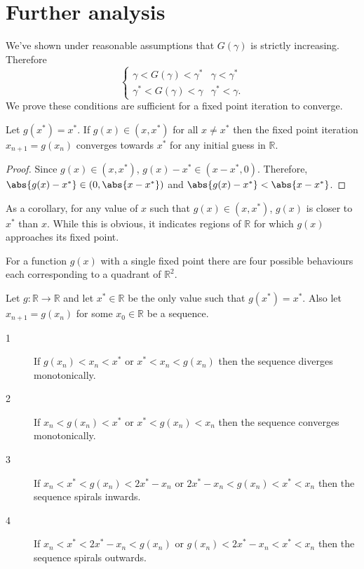 \documentclass{book}
\begin{document}
\section{Further analysis}

We've shown under reasonable assumptions that $G(\gamma)$ is strictly increasing.
Therefore
\begin{equation*}
\begin{cases} \gamma < G(\gamma) < \gamma^* & \gamma < \gamma^* \\
\gamma^* < G(\gamma) < \gamma & \gamma^* < \gamma . \end{cases}
\end{equation*}
We prove these conditions are sufficient for a fixed point iteration to converge.

\begin{lemma}
Let $g(x^*) = x^*$.
If $g(x) \in (x, x^*)$ for all $x \neq x^*$ then the fixed point iteration $x_{n+1} = g(x_n)$ converges towards $x^*$ for any initial guess in $\mathbb{R}$.
\end{lemma}

\begin{proof}
Since $g(x) \in (x,x^*)$, $g(x) - x^* \in (x-x^*,0)$.
Therefore, $\abs{g(x) - x^*} \in (0, \abs{x-x^*})$ and $\abs{g(x) - x^*} < \abs{x - x^*}$.
\end{proof}

As a corollary, for any value of $x$ such that $g(x) \in (x,x^*)$, $g(x)$ is closer to $x^*$ than $x$.
While this is obvious, it indicates regions of $\mathbb{R}$ for which $g(x)$ approaches its fixed point.

For a function $g(x)$ with a single fixed point there are four possible behaviours each corresponding to a quadrant of $\mathbb{R}^2$.

\begin{thm}
Let $g:\mathbb{R} \rightarrow \mathbb{R}$ and let $x^* \in \mathbb{R}$ be the only value such that $g(x^*) = x^*$.
Also let $x_{n+1} = g(x_n)$ for some $x_0 \in \mathbb{R}$ be a sequence.
\begin{description}
\item[1] If $g(x_n) < x_n < x^*$ or $x^* < x_n < g(x_n)$ then the sequence diverges monotonically.
\item[2] If $x_n < g(x_n) < x^*$ or $x^* < g(x_n) < x_n$ then the sequence converges monotonically.
\item[3] If $x_n < x^* < g(x_n) < 2 x^* - x_n$ or $2 x^* - x_n < g(x_n) < x^* < x_n$ then the sequence spirals inwards.
\item[4] If $x_n < x^* < 2 x^* - x_n < g(x_n)$ or $g(x_n) < 2 x^* - x_n < x^* < x_n$ then the sequence spirals outwards.
\end{description}
\end{thm}
\end{document}
